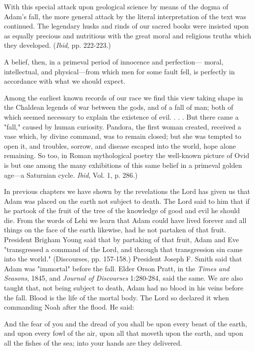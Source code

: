With this special attack upon geological science by means of the dogma of Adam's fall, the
more general attack by the literal interpretation of the text was continued. The legendary
husks and rinds of our sacred books were insisted upon as equally precious and nutritious
with the great moral and religious truths which they developed. (\textit{Ibid}, pp. 222-223.)

A belief, then, in a primeval period of innocence and perfection— moral, intellectual, and
physical—from which men for some fault fell, is perfectly in accordance with what we
should expect.

Among the earliest known records of our race we find this view taking shape in the Chaldean
legends of war between the gods, and of a fall of man; both of which seemed necessary to
explain the existence of evil. . . . But there came a "fall," caused by human curiosity.
Pandora, the first woman created, received a vase which, by divine command, was to remain
closed; but she was tempted to open it, and troubles, sorrow, and disease escaped into the
world, hope alone remaining. So too, in Roman mythological poetry the well-known picture
of Ovid is but one among the many exhibitions of this same belief in a primeval golden
age—a Saturnian cycle. \textit{Ibid}, Vol. 1, p. 286.)

In previous chapters we have shown by the revelations the Lord has given us that Adam was
placed on the earth not subject to death. The Lord said to him that if he partook of the fruit of
the tree of the knowledge of good and evil he should die. From the words of Lehi we learn
that Adam could have lived forever and all things on the face of the earth likewise, had he
not partaken of that fruit. President Brigham Young said that by partaking of that fruit, Adam
and Eve "transgressed a command of the Lord, and through that transgression sin came into
the world." (Discourses, pp. 157-158.) President Joseph F. Smith said that Adam was
"immortal" before the fall. Elder Orson Pratt, in the \textit{Times and Seasons}, 1845, and \textit{Journal of
Discourses} 1:280-284, said the same. We are also taught that, not being subject to death,
Adam had no blood in his veins before the fall. Blood is the life of the mortal body. The Lord
so declared it when commanding Noah after the flood. He said:

And the fear of you and the dread of you shall be upon every beast of the earth, and upon
every fowl of the air, upon all that moveth upon the earth, and upon all the fishes of the sea;
into your hands are they delivered.

